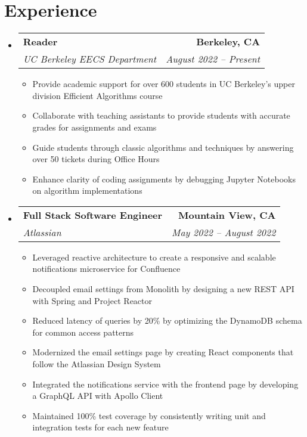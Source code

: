 \documentclass[letterpaper,11pt]{article}
\makeatletter
\newcommand{\resumeItem}[1]{
  \item\small{
    {#1 \vspace{-2pt}}
  }
}
\newcommand{\resumeSubheading}[4]{
  \vspace{-2pt}\item
    \begin{tabular*}{0.97\textwidth}[t]{l@{\extracolsep{\fill}}r}
      \textbf{#1} & #2 \\
      \textit{\small#3} & \textit{\small #4} \\
    \end{tabular*}\vspace{-7pt}
}
\newcommand{\resumeSubSubheading}[2]{
    \item
    \begin{tabular*}{0.97\textwidth}{l@{\extracolsep{\fill}}r}
      \textit{\small#1} & \textit{\small #2} \\
    \end{tabular*}\vspace{-7pt}
}
\newcommand{\resumeSubHeadingListStart}{\begin{itemize}[leftmargin=0.15in, label={}]}
\newcommand{\resumeSubHeadingListEnd}{\end{itemize}}
\newcommand{\resumeItemListStart}{\begin{itemize}}
\newcommand{\resumeItemListEnd}{\end{itemize}\vspace{-5pt}}
\makeatother
\begin{document}
\section{\textbf{Experience}}
  \resumeSubHeadingListStart

    \resumeSubheading
      {Reader}{\textbf{Berkeley, CA}}
      {UC Berkeley EECS Department}{August 2022 -- Present}
      \resumeItemListStart
        \resumeItem{Provide academic support for over 600 students in UC Berkeley's upper division Efficient Algorithms course}
        \resumeItem{Collaborate with teaching assistants to provide students with accurate grades for assignments and exams}
        \resumeItem{Guide students through classic algorithms and techniques by answering over 50 tickets during Office Hours}
        \resumeItem{Enhance clarity of coding assignments by debugging Jupyter Notebooks on algorithm implementations}
      \resumeItemListEnd

    \resumeSubheading
      {Full Stack Software Engineer}{\textbf{Mountain View, CA}}
      {Atlassian}{May 2022 -- August 2022}
      \resumeItemListStart
        \resumeItem{Leveraged reactive architecture to create a responsive and scalable notifications microservice for Confluence}
        \resumeItem{Decoupled email settings from Monolith by designing a new REST API with Spring and Project Reactor}
        \resumeItem{Reduced latency of queries by 20\% by optimizing the DynamoDB schema for common access patterns}
        \resumeItem{Modernized the email settings page by creating React components that follow the Atlassian Design System}
        \resumeItem{Integrated the notifications service with the frontend page by developing a GraphQL API with Apollo Client}
        \resumeItem{Maintained 100\% test coverage by consistently writing unit and integration tests for each new feature}
      \resumeItemListEnd
      

  \resumeSubHeadingListEnd


\end{document}

